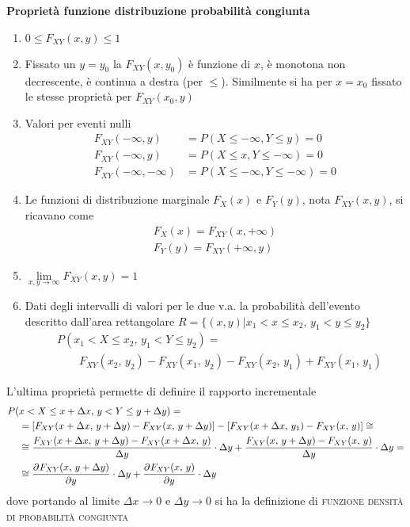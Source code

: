 \textbf{Proprietà funzione distribuzione probabilità congiunta}
\begin{enumerate}
\item $0\leq F_{XY}(x,y)\leq 1$
\item Fissato un $y=y_0$ la $F_{XY}(x,y_0)$ è funzione di $x$, è monotona non decrescente, è continua a destra (per $\leq$).
Similmente si ha per $x=x_0$ fissato le stesse proprietà per $F_{XY}(x_0,y)$
\item Valori per eventi nulli
\[\begin{split}
F_{XY}(-\infty,y)&=P(X\leq -\infty,Y\leq y)=0 \\
F_{XY}(-\infty,y)&=P(X\leq x,Y\leq -\infty)=0 \\
F_{XY}(-\infty,-\infty)&=P(X\leq -\infty,Y\leq -\infty)=0 
\end{split}\]
\item Le funzioni di distribuzione marginale $F_X(x)$ e $F_Y(y)$, nota $F_{XY}(x,y)$, si ricavano come
\[\begin{split}
F_X(x)=F_{XY}(x,+\infty)\\F_Y(y)=F_{XY}(+\infty,y)
\end{split}\]
\item $\lim\limits_{x,y\to\infty}F_{XY}(x,y)=1$
\item Dati degli intervalli di valori per le due v.a. la probabilità dell'evento descritto dall'area rettangolare $R=\{(x,y)|x_1<x\leq x_2,\, y_1<y\leq y_2\}$
\[\begin{split}
&P(x_1<X\leq x_2,\,y_1<Y\leq y_2)=\\&\qquad F_{XY}(x_2,\,y_2)-F_{XY}(x_1,\,y_2)-F_{XY}(x_2,\,y_1)+F_{XY}(x_1,\,y_1)\end{split}\]
\end{enumerate}
L'ultima proprietà permette di definire il rapporto incrementale \[\begin{split}P(&x<X\leq x+\Delta x,\,y<Y\leq y+\Delta y)=\\
&=\left[F_{XY}(x+\Delta x,\,y+\Delta y)-F_{XY}(x,\,y+\Delta y)\right]-\left[F_{XY}(x+\Delta x,\,y_1)-F_{XY}(x,\,y)\right]\cong\\
&\cong\frac{F_{XY}(x+\Delta x,\,y+\Delta y)-F_{XY}(x+\Delta x,\,y)}{\Delta y}\cdot\Delta y+\frac{F_{XY}(x,\,y+\Delta y)-F_{XY}(x,\,y)}{\Delta y}\cdot\Delta y=\\
&\cong\frac{\partial^{}F_{XY}(x,\,y+\Delta y)}{\partial y^{}}\cdot\Delta y+\frac{\partial^{}F_{XY}(x,\,y)}{\partial y^{}}\cdot\Delta y
\end{split}\]
dove portando al limite $\Delta x\to 0$ e $\Delta y\to 0$ si ha la definizione di \textsc{funzione densità di probabilità congiunta}
